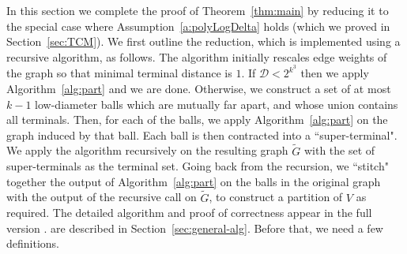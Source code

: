 \documentclass[twoside,leqno,twocolumn]{article}
\newcommand{\calD}{{\mathcal D}}
\begin{document}
In this section we complete the proof of Theorem~\ref{thm:main} by reducing it to the special case where Assumption~\ref{a:polyLogDelta} holds (which we proved in Section~\ref{sec:TCM}).
We first outline the reduction, which is implemented using a recursive algorithm,
as follows. 
The algorithm initially rescales edge weights of the graph so that minimal terminal distance is $1$. If $\calD < 2^{k^3}$ then we apply Algorithm~\ref{alg:part} and we are done. Otherwise, we construct a set of at most $k-1$ low-diameter balls which are mutually far apart, and whose union contains all terminals. Then, for each of the balls, we apply Algorithm~\ref{alg:part} on the graph induced by that ball. 
Each ball is then contracted into a ``super-terminal". We apply the algorithm recursively on the resulting graph $\tilde{G}$ with the set of super-terminals as the terminal set. Going back from the recursion, we ``stitch" together the output of Algorithm~\ref{alg:part} on the balls in the original graph with the output of the recursive call on $\tilde{G}$, to construct a partition of $V$ as required.
The detailed algorithm and proof of correctness  
\ifprocs
appear in the full version \cite{KKN13}.
\else
are described in Section~\ref{sec:general-alg}. Before that, we need a few definitions.
\end{document}
